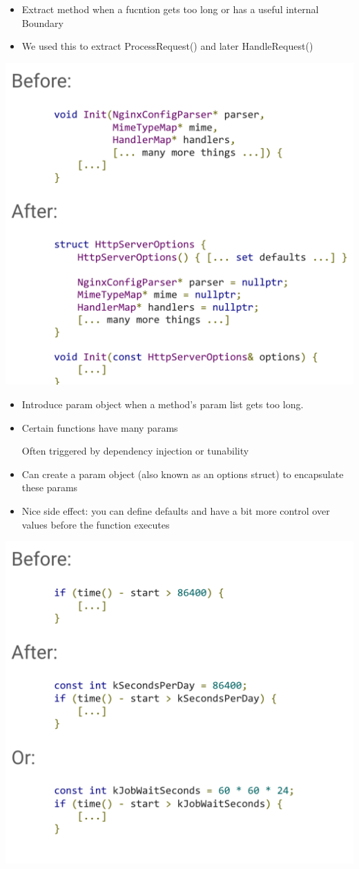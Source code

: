 \documentclass{article}
\begin{document}
\begin{center}
    \begin{itemize}
        \item Extract method when a fucntion gets too long or has a useful internal Boundary
        \item We used this to extract ProcessRequest() and later HandleRequest()
    \end{itemize}
\end{center}

\includegraphics*[width=0.6\linewidth]{refactorEx2.png}

\begin{center}
    \begin{itemize}
        \item Introduce param object when a method's param list gets too long.
        \item Certain functions have many params\par
        Often triggered by dependency injection or tunability
        \item Can create a param object (also known as an options struct) to encapsulate these params
        \item Nice side effect: you can define defaults and have a bit more control over values before the function executes
    \end{itemize}
\end{center}

\includegraphics*[width=0.6\linewidth]{refactorEx3.png}
\end{document}

